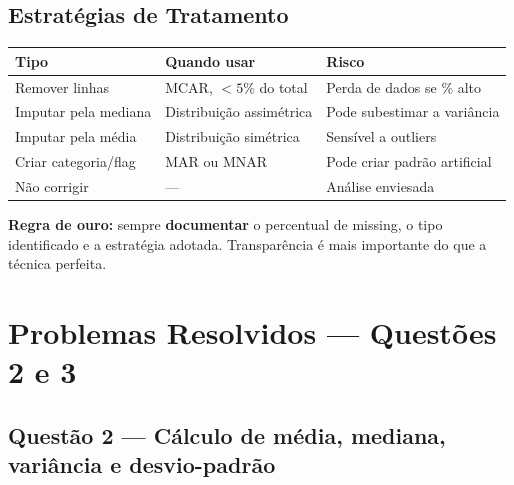\subsection*{Estratégias de Tratamento}

\begin{center}
\begin{tabular}{|l|p{4cm}|p{5.5cm}|}
\hline
\textbf{Tipo} & \textbf{Quando usar} & \textbf{Risco} \\
\hline
Remover linhas & MCAR, $<5\%$ do total & Perda de dados se \% alto \\
Imputar pela mediana & Distribuição assimétrica & Pode subestimar a variância \\
Imputar pela média & Distribuição simétrica & Sensível a outliers \\
Criar categoria/flag & MAR ou MNAR & Pode criar padrão artificial \\
Não corrigir & --- & Análise enviesada \\
\hline
\end{tabular}
\end{center}

\textbf{Regra de ouro:} sempre \textbf{documentar} o percentual de missing, o tipo identificado e a estratégia adotada. Transparência é mais importante do que a técnica perfeita.


\section{Problemas Resolvidos — Questões 2 e 3}

\subsection*{Questão 2 — Cálculo de média, mediana, variância e desvio-padrão}

